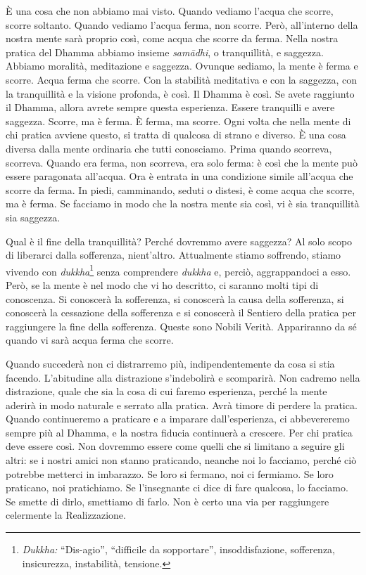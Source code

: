 È una cosa che non abbiamo mai visto. Quando vediamo l'acqua che scorre,
scorre soltanto. Quando vediamo l'acqua ferma, non scorre. Però,
all'interno della nostra mente sarà proprio così, come acqua che scorre
da ferma. Nella nostra pratica del Dhamma abbiamo insieme
\emph{samādhi}, o tranquillità, e saggezza. Abbiamo moralità,
meditazione e saggezza. Ovunque sediamo, la mente è ferma e scorre.
Acqua ferma che scorre. Con la stabilità meditativa e con la saggezza,
con la tranquillità e la visione profonda, è così. Il Dhamma è così. Se
avete raggiunto il Dhamma, allora avrete sempre questa esperienza.
Essere tranquilli e avere saggezza. Scorre, ma è ferma. È ferma, ma
scorre. Ogni volta che nella mente di chi pratica avviene questo, si
tratta di qualcosa di strano e diverso. È una cosa diversa dalla mente
ordinaria che tutti conosciamo. Prima quando scorreva, scorreva. Quando
era ferma, non scorreva, era solo ferma: è così che la mente può essere
paragonata all'acqua. Ora è entrata in una condizione simile all'acqua
che scorre da ferma. In piedi, camminando, seduti o distesi, è come
acqua che scorre, ma è ferma. Se facciamo in modo che la nostra mente
sia così, vi è sia tranquillità sia saggezza.

Qual è il fine della tranquillità? Perché dovremmo avere saggezza? Al
solo scopo di liberarci dalla sofferenza, nient'altro. Attualmente
stiamo soffrendo, stiamo vivendo con \emph{dukkha}\footnote{\emph{Dukkha:}
  ``Dis-agio'', ``difficile da sopportare'', insoddisfazione,
  sofferenza, insicurezza, instabilità, tensione.} senza comprendere
\emph{dukkha} e, perciò, aggrappandoci a esso. Però, se la mente è nel
modo che vi ho descritto, ci saranno molti tipi di conoscenza. Si
conoscerà la sofferenza, si conoscerà la causa della sofferenza, si
conoscerà la cessazione della sofferenza e si conoscerà il Sentiero
della pratica per raggiungere la fine della sofferenza. Queste sono
Nobili Verità. Appariranno da sé quando vi sarà acqua ferma che scorre.

Quando succederà non ci distrarremo più, indipendentemente da cosa si
stia facendo. L'abitudine alla distrazione s'indebolirà e scomparirà.
Non cadremo nella distrazione, quale che sia la cosa di cui faremo
esperienza, perché la mente aderirà in modo naturale e serrato alla
pratica. Avrà timore di perdere la pratica. Quando continueremo a
praticare e a imparare dall'esperienza, ci abbevereremo sempre più al
Dhamma, e la nostra fiducia continuerà a crescere. Per chi pratica deve
essere così. Non dovremmo essere come quelli che si limitano a seguire
gli altri: se i nostri amici non stanno praticando, neanche noi lo
facciamo, perché ciò potrebbe metterci in imbarazzo. Se loro si fermano,
noi ci fermiamo. Se loro praticano, noi pratichiamo. Se l'insegnante ci
dice di fare qualcosa, lo facciamo. Se smette di dirlo, smettiamo di
farlo. Non è certo una via per raggiungere celermente la Realizzazione.

